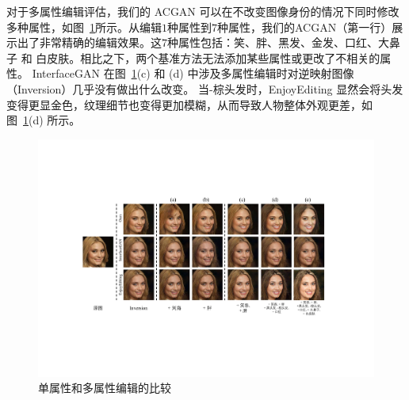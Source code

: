对于多属性编辑评估，我们的 ACGAN 可以在不改变图像身份的情况下同时修改多种属性，如图~\ref{fig:face}所示。从编辑$1$种属性到$7$种属性，我们的ACGAN（第一行）展示出了非常精确的编辑效果。这$7$种属性包括：笑、胖、黑发、金发、口红、大鼻子 和 白皮肤。相比之下，两个基准方法无法添加某些属性或更改了不相关的属性。 InterfaceGAN 在图~\ref{fig:face}(c) 和 (d) 中涉及多属性编辑时对逆映射图像（Inversion）几乎没有做出什么改变。 当-棕头发时，EnjoyEditing 显然会将头发变得更显金色，纹理细节也变得更加模糊，从而导致人物整体外观更差，如图~\ref{fig:face}(d) 所示。

\begin{figure}[!t]
     \begin{center}
        \includegraphics[width=1\linewidth]{figures/ACGAN/FaceMulti_center.pdf}
     \end{center}
     \caption{单属性和多属性编辑的比较}
     \label{fig:face}
\end{figure}

